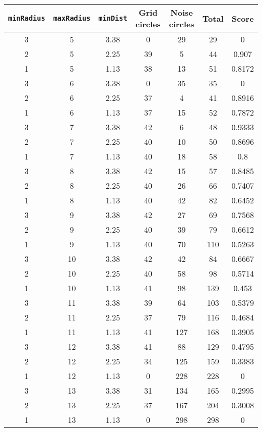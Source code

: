 \documentclass[letterpaper, 12pt]{article}
\begin{document}
\begin{longtable}{|c|c|c|c|c|c|c|}
\hline
\textbf{\texttt{minRadius}} & \textbf{\texttt{maxRadius}} & \textbf{\texttt{minDist}} & \textbf{Grid circles} & \textbf{Noise circles} & \textbf{Total} & \textbf{Score} \\
\hline
3 & 5 & 3.38 & 0 & 29 & 29 & 0 \\
\hline
2 & 5 & 2.25 & 39 & 5 & 44 & 0.907 \\
\hline
1 & 5 & 1.13 & 38 & 13 & 51 & 0.8172 \\
\hline
3 & 6 & 3.38 & 0 & 35 & 35 & 0 \\
\hline
2 & 6 & 2.25 & 37 & 4 & 41 & 0.8916 \\
\hline
1 & 6 & 1.13 & 37 & 15 & 52 & 0.7872 \\
\hline
3 & 7 & 3.38 & 42 & 6 & 48 & 0.9333 \\
\hline
2 & 7 & 2.25 & 40 & 10 & 50 & 0.8696 \\
\hline
1 & 7 & 1.13 & 40 & 18 & 58 & 0.8 \\
\hline
3 & 8 & 3.38 & 42 & 15 & 57 & 0.8485 \\
\hline
2 & 8 & 2.25 & 40 & 26 & 66 & 0.7407 \\
\hline
1 & 8 & 1.13 & 40 & 42 & 82 & 0.6452 \\
\hline
3 & 9 & 3.38 & 42 & 27 & 69 & 0.7568 \\
\hline
2 & 9 & 2.25 & 40 & 39 & 79 & 0.6612 \\
\hline
1 & 9 & 1.13 & 40 & 70 & 110 & 0.5263 \\
\hline
3 & 10 & 3.38 & 42 & 42 & 84 & 0.6667 \\
\hline
2 & 10 & 2.25 & 40 & 58 & 98 & 0.5714 \\
\hline
1 & 10 & 1.13 & 41 & 98 & 139 & 0.453 \\
\hline
3 & 11 & 3.38 & 39 & 64 & 103 & 0.5379 \\
\hline
2 & 11 & 2.25 & 37 & 79 & 116 & 0.4684 \\
\hline
1 & 11 & 1.13 & 41 & 127 & 168 & 0.3905 \\
\hline
3 & 12 & 3.38 & 41 & 88 & 129 & 0.4795 \\
\hline
2 & 12 & 2.25 & 34 & 125 & 159 & 0.3383 \\
\hline
1 & 12 & 1.13 & 0 & 228 & 228 & 0 \\
\hline
3 & 13 & 3.38 & 31 & 134 & 165 & 0.2995 \\
\hline
2 & 13 & 2.25 & 37 & 167 & 204 & 0.3008 \\
\hline
1 & 13 & 1.13 & 0 & 298 & 298 & 0 \\

\end{longtable}
\end{document}
